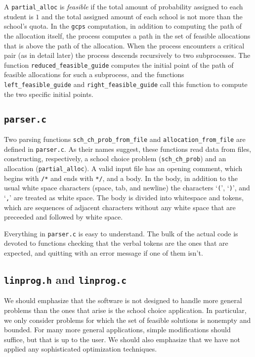\documentclass[12pt]{article}
\theoremstyle{definition}
\begin{document}
\begin{appendix}
A \texttt{partial\_alloc} is \emph{feasible} if the total amount of
probability assigned to each student is $1$ and the total assigned
amount of each school is not more than the school's quota.  In the
\texttt{gcps} computation, in addition to computing the path of the
allocation itself, the process computes a path in the set of feasible
allocations that is above the path of the allocation.  When the
process encounters a critical pair (as in detail later) the process
descends recursively to two subprocesses.  The function
\texttt{reduced\_feasible\_guide} computes the initial point of the
path of feasible allocations for such a subprocess, and the functions
\texttt{left\_feasible\_guide} and \texttt{right\_feasible\_guide}
call this function to compute the two specific initial points.

\subsection{\texttt{parser.c}}

Two parsing functions \texttt{sch\_ch\_prob\_from\_file} and
\texttt{allocation\_from\_file} are defined in \texttt{parser.c}.  As
their names suggest, these functions read data from files,
constructing, respectively, a school choice problem
(\texttt{sch\_ch\_prob}) and an allocation (\texttt{partial\_alloc}).
A valid input file has an opening comment, which begins with
\texttt{/*} and ends with \texttt{*/}, and a body.  In the body, in
addition to the usual white space characters (space, tab, and newline)
the characters `\texttt{(}', `\texttt{)}', and `\texttt{,}' are
treated as white space.  The body is divided into whitespace and
tokens, which are sequences of adjacent characters without any white
space that are preceeded and followed by white space.

Everything in \texttt{parser.c} is easy to understand.  The bulk of
the actual code is devoted to functions checking that the verbal
tokens are the ones that are expected, and quitting with an error
message if one of them isn't.

\subsection{\texttt{linprog.h} and \texttt{linprog.c}}

We should emphasize that the software is not designed to handle more
general problems than the ones that arise is the school choice
application.  In particular, we only consider problems for which the
set of feasible solutions is nonempty and bounded.  For many more
general applications, simple modifications should suffice, but that is
up to the user.  We should also emphasize that we have not applied any
sophisticated optimization techniques.


\end{appendix}
\end{document}
